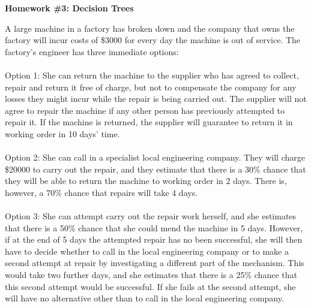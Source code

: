 \documentclass[12pt]{article}
\begin{document}
\begin{center} \textbf{Homework \#3: Decision Trees} \end{center}

A large machine in a factory has broken down and the company that owns the factory will incur costs of \$3000 for every day the machine is out of service. The factory's engineer has three immediate options: 
\\~\\
Option 1: She can return the machine to the supplier who has agreed to collect, repair and return it free of charge, but not to compensate the company for any losses they might incur while the repair is being carried out. The supplier will not agree to repair the machine if any other person has previously attempted to repair it. If the machine is returned, the supplier will guarantee to return it in working order in 10 days' time. 
\\~\\
Option 2: She can call in a specialist local engineering company. They will charge \$20000 to carry out the repair, and they estimate that there is a 30\% chance that they will be able to return the machine to working order in 2 days. There is, however, a 70\% chance that repairs will take 4 days. 
\\~\\
Option 3: She can attempt carry out the repair work herself, and she estimates that there is a 50\% chance that she could mend the machine in 5 days. However, if at the end of 5 days the attempted repair has no been successful, she will then have to decide whether to call in the local engineering company or to make a second attempt at repair by investigating a different part of the mechanism. This would take two further days, and she estimates that there is a 25\% chance that this second attempt would be successful. If she fails at the second attempt, she will have no alternative other than to call in the local engineering company. 
\end{document}
